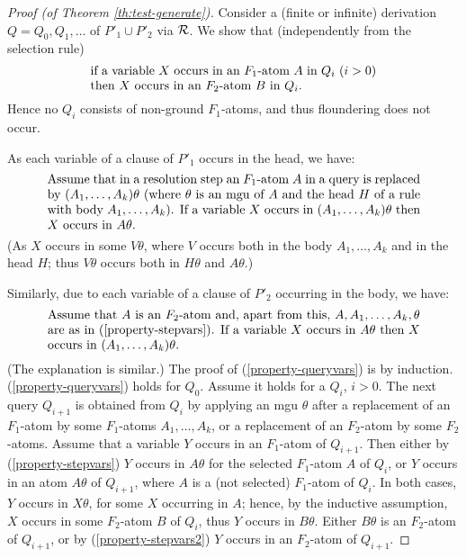 \documentclass{tlp}
\newcommand*{\seq}[2][n]  {{#2_{1}, \allowbreak \ldots, \allowbreak #2_{#1}}}
\begin{document}
\begin{proof}[Proof \rm (of Theorem \ref{th:test-generate})]
Consider a (finite or infinite)
derivation $Q\mathop= Q_0, Q_1,\ldots$ of $P'_1\cup P'_2$ via $\cal R$.
We show that (independently from the selection rule)
\begin{equation}
\label{property-queryvars}
  \parbox{.66\textwidth}
  {
  if a variable $X$ occurs in an $F_1$-atom $A$ in $Q_i$  ($i>0$)
  then $X$ occurs in an $F_2$-atom $B$ in $Q_i$.
  }
\end{equation}
Hence no $Q_i$ consists of non-ground $F_1$-atoms, and thus floundering does
not occur. 

As each variable of a clause of $P'_1$ occurs in the head, we have:
\begin{equation}
\label{property-stepvars}
  \parbox{.86\textwidth}
{
           Assume that in a resolution step an $F_1$-atom $A$ in a query 
           is replaced by $(\seq[k]A)\theta$ (where $\theta$ is an mgu of $A$
           and the head $H$ of a rule with body $\seq[k]A$).

  If
           a variable $X$ occurs in $(\seq[k]A)\theta$ then $X$ occurs in
           $A\theta$. 
         }
\end{equation}
(As $X$ occurs in some $V\theta$, where $V$ occurs both 
in the body  $\seq[k]A$ and in the head $H$;
thus $V\theta$ occurs both in $H\theta$ and $A\theta$.)

Similarly, due to each variable of a clause of $P'_2$ occurring in the body,
we have:
\begin{equation}
\label{property-stepvars2}
  \parbox{.86\textwidth}
         {
           Assume that $A$ is an $F_2$-atom and, apart from this,
           $A,\seq[k]A,\theta$ are as in 
           (\ref{property-stepvars}).
           If a variable $X$ occurs in $A\theta$ then  $X$ occurs in
           $(\seq[k]A)\theta$. 
         }
\end{equation}
(The explanation is similar.)
The proof of  (\ref{property-queryvars}) is  by induction.
(\ref{property-queryvars}) holds for $Q_0$.
Assume it holds for a $Q_i$, $i>0$.  The next query
$Q_{i+1}$ is obtained from $Q_i$ by applying an mgu $\theta$
after a replacement of an $F_1$-atom by some $F_1$-atoms $\seq[k]A$, 
or a replacement of an $F_2$-atom by some $F_2$-atoms.
Assume that a variable $Y$ occurs in an $F_1$-atom of $Q_{i+1}$.
Then either by (\ref{property-stepvars}) $Y$ occurs in $A\theta$ 
for the selected $F_1$-atom $A$ of $Q_i$,
or $Y$ occurs in an atom $A\theta$ of $Q_{i+1}$, where $A$ is
a (not selected) $F_1$-atom of $Q_i$.   
In both cases, $Y$ occurs in $X\theta$, for some $X$ occurring in $A$;
hence, by the inductive assumption, $X$ occurs in some $F_2$-atom $B$ of
$Q_i$, thus $Y$ occurs in $B\theta$.  
Either $B\theta$ is an $F_2$-atom of $Q_{i+1}$, 
or by (\ref{property-stepvars2}) $Y$ occurs in an $F_2$-atom of $Q_{i+1}$.
\end{proof}
\end{document}
